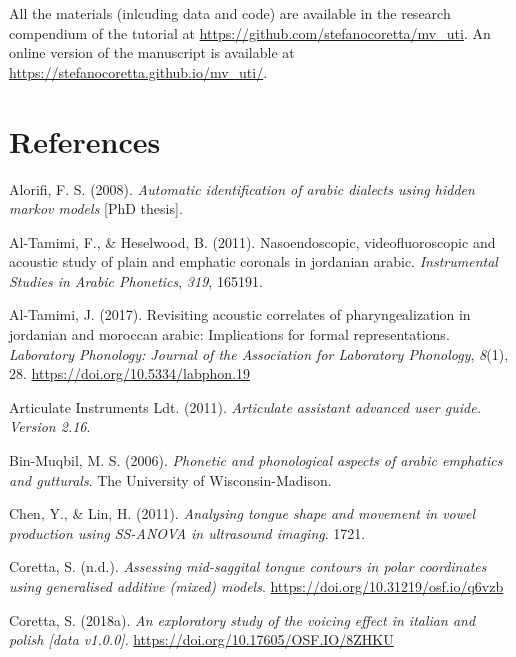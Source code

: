 \documentclass[
  man,
  longtable,
  nolmodern,
  notxfonts,
  notimes,
  colorlinks=true,linkcolor=blue,citecolor=blue,urlcolor=blue]{apa7}
\newlength{\cslhangindent}
\newenvironment{CSLReferences}[2] %
 {\begin{list}{}{%
  \setlength{\itemindent}{0pt}
  \setlength{\leftmargin}{0pt}
  \setlength{\parsep}{0pt}
  \ifodd #1
   \setlength{\leftmargin}{\cslhangindent}
   \setlength{\itemindent}{-1\cslhangindent}
  \fi
  \setlength{\itemsep}{#2\baselineskip}}}
 {\end{list}}
\begin{document}
All the materials (inlcuding data and code) are available in the
research compendium of the tutorial at
\url{https://github.com/stefanocoretta/mv_uti}. An online version of the
manuscript is available at
\url{https://stefanocoretta.github.io/mv_uti/}.

\section{References}\label{references}

\label{refs}
\begin{CSLReferences}{1}{0}
Alorifi, F. S. (2008). \emph{Automatic identification of arabic dialects
using hidden markov models} {[}PhD thesis{]}.

Al-Tamimi, F., \& Heselwood, B. (2011). Nasoendoscopic,
videofluoroscopic and acoustic study of plain and emphatic coronals in
jordanian arabic. \emph{Instrumental Studies in Arabic Phonetics},
\emph{319}, 165191.

Al-Tamimi, J. (2017). Revisiting acoustic correlates of
pharyngealization in jordanian and moroccan arabic: Implications for
formal representations. \emph{Laboratory Phonology: Journal of the
Association for Laboratory Phonology}, \emph{8}(1), 28.
\url{https://doi.org/10.5334/labphon.19}

Articulate Instruments Ldt. (2011). \emph{Articulate assistant advanced
user guide. {Version} 2.16}.

Bin-Muqbil, M. S. (2006). \emph{Phonetic and phonological aspects of
arabic emphatics and gutturals}. The University of Wisconsin-Madison.

Chen, Y., \& Lin, H. (2011). \emph{Analysing tongue shape and movement
in vowel production using SS-ANOVA in ultrasound imaging}. 1721.

Coretta, S. (n.d.). \emph{Assessing mid-saggital tongue contours in
polar coordinates using generalised additive (mixed) models}.
\url{https://doi.org/10.31219/osf.io/q6vzb}

Coretta, S. (2018a). \emph{An exploratory study of the voicing effect in
italian and polish {[}data v1.0.0{]}}.
\url{https://doi.org/10.17605/OSF.IO/8ZHKU}


\end{CSLReferences}
\end{document}
